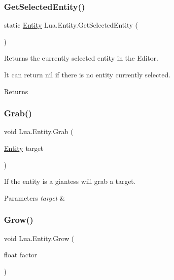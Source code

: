 \subsubsection{\texorpdfstring{GetSelectedEntity()}{GetSelectedEntity()}}
{\footnotesize\ttfamily static \mbox{\hyperlink{class_lua_1_1_entity}{Entity}} Lua.\+Entity.\+Get\+Selected\+Entity (\begin{DoxyParamCaption}{ }\end{DoxyParamCaption})\hspace{0.3cm}{\ttfamily [static]}}



Returns the currently selected entity in the Editor. 

It can return nil if there is no entity currently selected. \begin{DoxyReturn}{Returns}

\end{DoxyReturn}
\mbox{\label{class_lua_1_1_entity_a6ddff7e7a95c85ba34bee6b8b5c4ee93}} 
\subsubsection{\texorpdfstring{Grab()}{Grab()}}
{\footnotesize\ttfamily void Lua.\+Entity.\+Grab (\begin{DoxyParamCaption}\item[{\mbox{\hyperlink{class_lua_1_1_entity}{Entity}}}]{target }\end{DoxyParamCaption})}



If the entity is a giantess will grab a target. 


\begin{DoxyParams}{Parameters}
{\em target} & \\
\hline
\end{DoxyParams}
\mbox{\label{class_lua_1_1_entity_a92feb21c4219c60a7e5935733302083f}} 
\subsubsection{\texorpdfstring{Grow()}{Grow()}\hspace{0.1cm}{\footnotesize\ttfamily [1/2]}}
{\footnotesize\ttfamily void Lua.\+Entity.\+Grow (\begin{DoxyParamCaption}\item[{float}]{factor }\end{DoxyParamCaption})}



